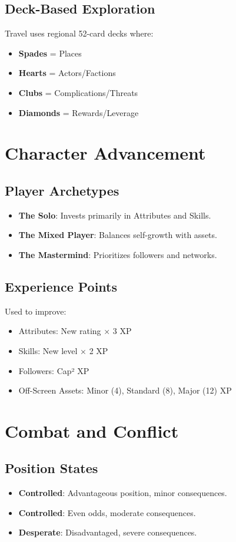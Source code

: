 \documentclass[11pt,twoside]{article}
\begin{document}
\subsection{Deck-Based Exploration}
Travel uses regional 52-card decks where:
\begin{itemize}[leftmargin=*]
    \item \textbf{Spades} = Places
    \item \textbf{Hearts} = Actors/Factions
    \item \textbf{Clubs} = Complications/Threats
    \item \textbf{Diamonds} = Rewards/Leverage
\end{itemize}

\section{Character Advancement}

\subsection{Player Archetypes}
\begin{itemize}[leftmargin=*]
    \item \textbf{The Solo}: Invests primarily in Attributes and Skills.
    \item \textbf{The Mixed Player}: Balances self-growth with assets.
    \item \textbf{The Mastermind}: Prioritizes followers and networks.
\end{itemize}

\subsection{Experience Points}
Used to improve:
\begin{itemize}[leftmargin=*]
    \item Attributes: New rating × 3 XP
    \item Skills: New level × 2 XP
    \item Followers: Cap² XP
    \item Off-Screen Assets: Minor (4), Standard (8), Major (12) XP
\end{itemize}

\section{Combat and Conflict}

\subsection{Position States}
\begin{itemize}[leftmargin=*]
    \item \textbf{Controlled}: Advantageous position, minor consequences.
    \item \textbf{Controlled}: Even odds, moderate consequences.
    \item \textbf{Desperate}: Disadvantaged, severe consequences.
\end{itemize}
\end{document}
